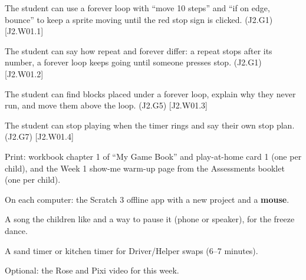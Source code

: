 
\begin{objectives}
  \item The student can use a forever loop with \enquote{move 10 steps} and \enquote{if on edge, bounce} to keep a sprite moving until the red stop sign is clicked. (J2.G1) [J2.W01.1]
  \item The student can say how repeat and forever differ: a repeat stops after its number, a forever loop keeps going until someone presses stop. (J2.G1) [J2.W01.2]
  \item The student can find blocks placed under a forever loop, explain why they never run, and move them above the loop. (J2.G5) [J2.W01.3]
  \item The student can stop playing when the timer rings and say their own stop plan. (J2.G7) [J2.W01.4]
\end{objectives}

\begin{materials}
  \item Print: workbook chapter 1 of \enquote{My Game Book} and play-at-home card 1 (one per child), and the Week 1 show-me warm-up page from the Assessments booklet (one per child).
  \item On each computer: the Scratch 3 offline app with a new project and a \textbf{mouse}.
  \item A song the children like and a way to pause it (phone or speaker), for the freeze dance.
  \item A sand timer or kitchen timer for Driver/Helper swaps (6--7 minutes).
  \item Optional: the Rose and Pixi video for this week.
\end{materials}

